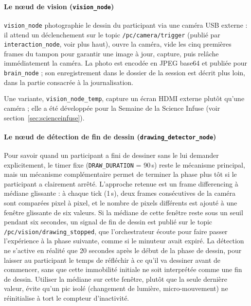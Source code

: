 \documentclass[11pt]{article}
\begin{document}
\paragraph{Le nœud de vision (\texttt{vision\_node})}

\texttt{vision\_node} photographie le dessin du participant via une caméra USB externe : il attend un déclenchement sur le topic \texttt{/pc/camera/trigger} (publié par \texttt{interaction\_node}, voir plus haut), ouvre la caméra, vide les cinq premières frames du tampon pour garantir une image à jour, capture, puis relâche immédiatement la caméra. La photo est encodée en JPEG base64 et publiée pour \texttt{brain\_node} ; son enregistrement dans le dossier de la session est décrit plus loin, dans la partie consacrée à la journalisation.

Une variante, \texttt{vision\_node\_temp}, capture un écran HDMI externe plutôt qu'une caméra ; elle a été développée pour la Semaine de la Science Infuse (voir section~\ref{sec:scienceinfuse}).

\paragraph{Le nœud de détection de fin de dessin (\texttt{drawing\_detector\_node})}
\label{sec:drawing_detector}

Pour savoir quand un participant a fini de dessiner sans le lui demander explicitement, le timer fixe (\texttt{DRAW\_DURATION} = 90\,s) reste le mécanisme principal, mais un mécanisme complémentaire permet de terminer la phase plus tôt si le participant a clairement arrêté. L'approche retenue est un frame differencing à médiane glissante : à chaque tick (1\,s), deux frames consécutives de la caméra sont comparées pixel à pixel, et le nombre de pixels différents est ajouté à une fenêtre glissante de six valeurs. Si la médiane de cette fenêtre reste sous un seuil pendant six secondes, un signal de fin de dessin est publié sur le topic \texttt{/pc/vision/drawing\_stopped}, que l'orchestrateur écoute pour faire passer l'expérience à la phase suivante, comme si le minuteur avait expiré. La détection ne s'active en réalité que 20 secondes après le début de la phase de dessin, pour laisser au participant le temps de réfléchir à ce qu'il va dessiner avant de commencer, sans que cette immobilité initiale ne soit interprétée comme une fin de dessin. Utiliser la médiane sur cette fenêtre, plutôt que la seule dernière valeur, évite qu'un pic isolé (changement de lumière, micro-mouvement) ne réinitialise à tort le compteur d'inactivité.
\end{document}
